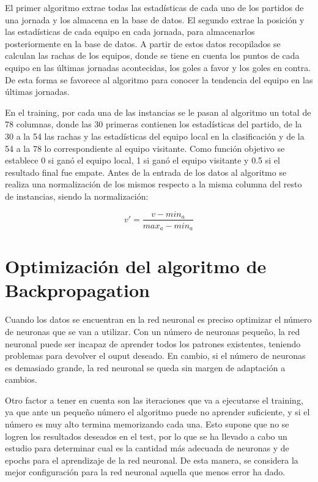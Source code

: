El primer algoritmo extrae todas las estadísticas de cada uno de los partidos de una jornada y los almacena en la base de datos. El segundo extrae la posición y las estadísticas de cada equipo en cada jornada, para almacenarlos posteriormente en la base de datos. A partir de estos datos recopilados se calculan las rachas de los equipos, donde se tiene en cuenta los puntos de cada equipo en las últimas jornadas acontecidas, los goles a favor y  los goles en contra. De esta forma se favorece al algoritmo para conocer la tendencia del equipo en las últimas jornadas. 

En el training, por cada una de las instancias se le pasan al algoritmo un total de 78 columnas, donde las 30 primeras contienen los estadísticas del partido, de la 30 a la 54 las rachas y las estadísticas del equipo local en la clasificación y de la 54 a la 78 lo correspondiente al equipo visitante. Como función objetivo se establece 0 si ganó el equipo local, 1 si ganó el equipo visitante y 0.5 si el resultado final fue empate.
Antes de la entrada de los datos al algoritmo se realiza una normalización de los mismos respecto a la misma columna del resto de instancias, siendo la normalización:
\begin{center}
\large{$$v' = \frac{v-min_{a}}{max_{a}-min_{a}}$$}
\end{center}


\section{Optimización del algoritmo de Backpropagation}
Cuando los datos se encuentran en la red neuronal es preciso optimizar el número de neuronas que se van a utilizar. Con un número de neuronas pequeño, la red neuronal puede ser incapaz de aprender todos los patrones existentes, teniendo problemas para devolver el ouput deseado. En cambio, si el número de neuronas es demasiado grande, la red neuronal se queda sin margen de adaptación a cambios.

Otro factor a tener en cuenta son las iteraciones que va a ejecutarse el training, ya que ante un pequeño número el algoritmo puede no aprender suficiente, y si el número es muy alto termina memorizando cada una. Esto supone que no se logren los resultados deseados en el test, por lo que se ha llevado a cabo un estudio para determinar cual es la cantidad más adecuada de neuronas y de epochs para el aprendizaje de la red neuronal.
De esta manera, se considera la mejor  configuración para la red neuronal aquella que menos  error ha dado.

